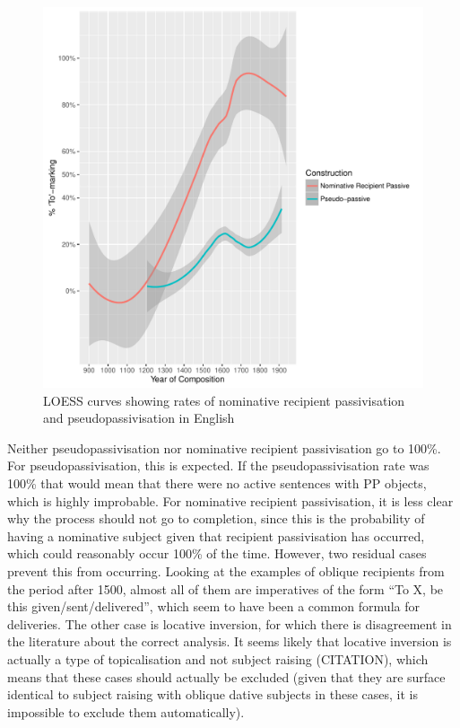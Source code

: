 	\begin{figure}[ht!]
		\includegraphics[width=\linewidth]{../images/recpas-pseudo}
		\caption{LOESS curves showing rates of nominative recipient passivisation and pseudopassivisation in English}
		\label{fig:recpas-pseudo}
	\end{figure}

	Neither pseudopassivisation nor nominative recipient passivisation go to 100\%. For pseudopassivisation, this is expected. If the pseudopassivisation rate was 100\% that would mean that there were no active sentences with PP objects, which is highly improbable. For nominative recipient passivisation, it is less clear why the process should not go to completion, since this is the probability of having a nominative subject given that recipient passivisation has occurred, which could reasonably occur 100\% of the time. However, two residual cases prevent this from occurring. Looking at the examples of oblique recipients from the period after 1500, almost all of them are imperatives of the form ``To X, be this given/sent/delivered'', which seem to have been a common formula for deliveries. The other case is locative inversion, for which there is disagreement in the literature about the correct analysis. It seems likely that locative inversion is actually a type of topicalisation and not subject raising (CITATION), which means that these cases should actually be excluded (given that they are surface identical to subject raising with oblique dative subjects in these cases, it is impossible to exclude them automatically).

